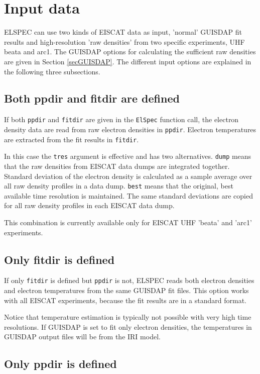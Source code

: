 \documentclass[12pt,a4paper]{report}
\begin{document}
\section{Input data}

ELSPEC can use two kinds of EISCAT data as input, 'normal' GUISDAP fit results and high-resolution 'raw densities' from two specific experiments, UHF beata and arc1.  The GUISDAP options for calculating the sufficient raw densities are given in Section \ref{secGUISDAP}. The different input options are explained in the following three subsections. 

\subsection{Both ppdir and fitdir are defined}

If both \verb|ppdir| and \verb|fitdir| are given in the \verb|ElSpec| function call, the electron density data are read from raw electron densities in \verb|ppdir|. Electron temperatures are extracted from the fit results in  \verb|fitdir|. 

In this case the \verb|tres| argument is effective and has two alternatives. \verb|dump| means that the raw densities from EISCAT data dumps are integrated together. Standard deviation of the electron density is calculated as a sample average over all raw density profiles in a data dump. \verb|best| means that the original, best available time resolution is maintained. The same standard deviations are copied for all raw density profiles in each EISCAT data dump. 

This combination is currently available only for EISCAT UHF 'beata' and 'arc1' experiments. 

\subsection{Only fitdir is defined}

If only \verb|fitdir| is defined but \verb|ppdir| is not, ELSPEC reads both electron densities and electron temperatures from the same GUISDAP fit files. This option works with all EISCAT experiments, because the fit results are in a standard format. 

Notice that temperature estimation is typically not possible with very high time resolutions. If GUISDAP is set to fit only electron densities, the temperatures in GUISDAP output files will be from the IRI model. 


\subsection{Only ppdir is defined}
\end{document}

